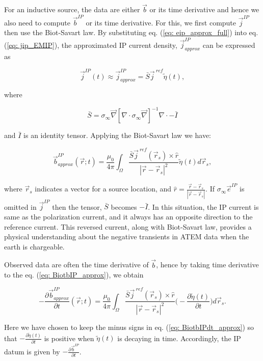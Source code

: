 \documentclass[extra,mreferee]{gji}
\renewcommand{\div}{\nabla\cdot}
\newcommand{\grad}{\vec \nabla}
\newcommand{\siginf}{\sigma_\infty}
\renewcommand {\j}  { {\vec j} }
\renewcommand {\b}  { {\vec b} }
\newcommand {\e}  { {\vec e} }
\newcommand{\peta}{\tilde{\eta}}
\newcommand{\jref}{\j^{\ ref}}
\begin{document}
For an inductive source, the data are either $\b$ or its time derivative and hence we also need to compute $\b^{IP}$ or its time derivative.
For this, we first compute $\j^{IP}$ then use the Biot-Savart law.
By substituting eq. (\ref{eq: eip_approx_full}) into eq. (\ref{eq: jip_EMIP}), the approximated IP current density, $\j^{IP}_{approx}$ can be expressed as
\begin{linenomath*}
\begin{equation}
  \j^{IP}(t) \approx \j^{IP}_{approx} = \bar{S}\jref\peta(t),
  \label{eq: jip_approx}
\end{equation}
\end{linenomath*}
where
\begin{linenomath*}
\begin{equation}
  \bar{S} = \siginf\grad[\div \siginf\grad]^{-1}\div-\bar{I}
\end{equation}
\end{linenomath*}
and $\bar{I}$ is an identity tensor.
Applying the Biot-Savart law we have:
\begin{linenomath*}
\begin{equation}
  \b^{IP}_{approx}(\vec{r}; t) = \frac{\mu_0}{4\pi}\int_{\Omega}  \frac{\bar{S}\j^{\ ref}(\vec{r}_s)\times\hat{r}}{|\vec{r}-\vec{r}_s|^2}\peta(t)d\vec{r}_s,
  \label{eq: BiotbIP_approx}
\end{equation}
\end{linenomath*}
where $\vec{r}_s$ indicates a vector for a source location, and $\hat{r}=\frac{\vec{r}-\vec{r}_s}{|\vec{r}-\vec{r}_s|}$.
If $\siginf\e^{IP}$ is omitted in  $\j^{IP}$ then the tensor, $\bar{S}$ becomes $-\bar{I}$.
In this situation, the IP current is same as the polarization current, and it always has an opposite direction to the reference current.
This reversed current, along with Biot-Savart law,  provides a physical understanding about the negative transients in ATEM data when the earth is chargeable.

Observed data are often the time derivative of $\b$, hence by taking time derivative to the eq. (\ref{eq: BiotbIP_approx}), we obtain
\begin{linenomath*}
\begin{equation}
  -\frac{\partial\b^{IP}_{approx}}{\partial t}(\vec{r}; t) = \frac{\mu_0}{4\pi} \int_{\Omega}  \frac{\bar{S}\jref(\vec{r}_s)\times\hat{r}}{|\vec{r}-\vec{r}_s|^2} \Big( -\frac{\partial \peta(t)}{\partial t} \Big) d\vec{r}_s.
  \label{eq: BiotbIPdt_approx}
\end{equation}
\end{linenomath*}
Here we have chosen to keep the minus signs in eq. (\ref{eq: BiotbIPdt_approx}) so that $-\frac{\partial \peta(t)}{\partial t}$ is positive when $\peta(t)$ is decaying in time.
Accordingly, the IP datum is given by  $-\frac{\partial\b^{IP}}{\partial t}$.
\end{document}
